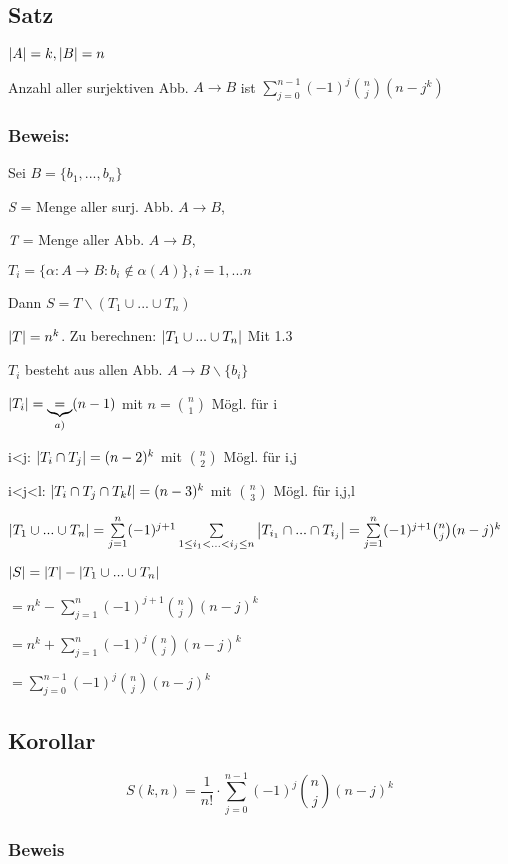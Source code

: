 \subsection{Satz}
$\left|A\right|=k, \left|B\right|=n$

Anzahl aller surjektiven Abb. $A \rightarrow B$ ist $\sum_{j=0}^{n-1}(-1)^j \binom{n}{j}(n-j^k)$

\subsubsection*{Beweis:}
Sei $B = \{b_1,...,b_n  \}$

\textit{S} = Menge aller surj. Abb. $A \rightarrow B$,

\textit{T} = Menge aller Abb.  $A \rightarrow B$,

$T_i = \{\alpha: A \rightarrow B: b_i \notin \alpha (A)  \}, i=1,...n$

Dann $S=T\backslash(T_1\cup ... \cup T_n)$

$\left|T\right| = n^k$. Zu berechnen: $\left|T_1 \cup ... \cup T_n\right|$ Mit 1.3 %

$T_i$ besteht aus allen Abb. $A\rightarrow B\backslash\{b_i\}$

$\left|T_i\right| = \underbrace{=}_{a)} (n-1)$ mit $n= \binom{n}{1}$  Mögl. für i

i<j: $\left|T_i \cap T_j\right| = (n-2)^k$ mit $\binom{n}{2}$ Mögl. für i,j

i<j<l: $\left|T_i \cap T_j \cap T_kl\right| = (n-3)^k$ mit $\binom{n}{3}$ Mögl. für i,j,l

$\abs{T_1 \cup ...\cup T_n} = \sum_{j=1}^{n}(-1)^{j+1} \sum_{1\leq i_1<...<i_j\leq n}\abs{T_{i_1}\cap ... \cap T_{i_j}} = \sum_{j=1}^{n}(-1)^{j+1} \binom{n}{j}(n-j)^k$

$\left|S\right|= \left|T\right|-\left|T_1 \cup ... \cup T_n\right|$

$= n^k-\sum_{j=1}^{n}(-1)^{j+1}\binom{n}{j}(n-j)^{k}$

$= n^k+\sum_{j=1}^{n}(-1)^{j}\binom{n}{j}(n-j)^{k}$

$= \sum_{j=0}^{n-1}(-1)^{j}\binom{n}{j}(n-j)^{k}$

\subsection{Korollar} %

\[ S(k,n) = \frac{1}{n!}\cdot \sum_{j=0}^{n-1}(-1)^j\binom{n}{j}(n-j)^k \]

\subsubsection*{Beweis}

